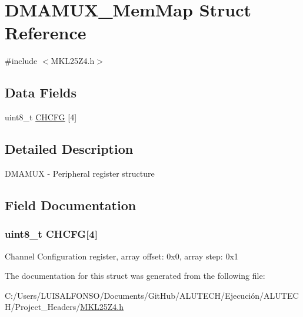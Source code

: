 \hypertarget{struct_d_m_a_m_u_x___mem_map}{}\section{D\+M\+A\+M\+U\+X\+\_\+\+Mem\+Map Struct Reference}
\label{struct_d_m_a_m_u_x___mem_map}


{\ttfamily \#include $<$M\+K\+L25\+Z4.\+h$>$}

\subsection*{Data Fields}
\begin{DoxyCompactItemize}
\item 
uint8\+\_\+t \hyperlink{struct_d_m_a_m_u_x___mem_map_a64e588f876a699e0490628f97bb17121}{C\+H\+C\+F\+G} \mbox{[}4\mbox{]}
\end{DoxyCompactItemize}


\subsection{Detailed Description}
D\+M\+A\+M\+U\+X -\/ Peripheral register structure 

\subsection{Field Documentation}
\hypertarget{struct_d_m_a_m_u_x___mem_map_a64e588f876a699e0490628f97bb17121}{}
\subsubsection[{C\+H\+C\+F\+G}]{\setlength{\rightskip}{0pt plus 5cm}uint8\+\_\+t C\+H\+C\+F\+G\mbox{[}4\mbox{]}}\label{struct_d_m_a_m_u_x___mem_map_a64e588f876a699e0490628f97bb17121}
Channel Configuration register, array offset\+: 0x0, array step\+: 0x1 

The documentation for this struct was generated from the following file\+:\begin{DoxyCompactItemize}
\item 
C\+:/\+Users/\+L\+U\+I\+S\+A\+L\+F\+O\+N\+S\+O/\+Documents/\+Git\+Hub/\+A\+L\+U\+T\+E\+C\+H/\+Ejecución/\+A\+L\+U\+T\+E\+C\+H/\+Project\+\_\+\+Headers/\hyperlink{_m_k_l25_z4_8h}{M\+K\+L25\+Z4.\+h}\end{DoxyCompactItemize}
